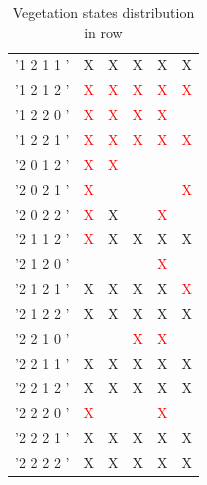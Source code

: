 \documentclass[preprint,3p,times,twocolumn]{elsarticle}
\begin{document}
\begin{table}[h]
\begin{center}
\begin{tabular}{|p{}|p{}|p{}|p{}|p{}|p{}|}
			'1 2 1 1 '     & X                     & X                     & X                  & X                  & X                   \\
			'1 2 1 2 '     & \textcolor{red}{X}    & \textcolor{red}{X}    & \textcolor{red}{X} & \textcolor{red}{X} & \textcolor{red}{X}  \\
			'1 2 2 0 '     & \textcolor{red}{X}    & \textcolor{red}{X}    & \textcolor{red}{X} & \textcolor{red}{X}  &                    \\
			'1 2 2 1 '     & \textcolor{red}{X}    & \textcolor{red}{X}    & \textcolor{red}{X} & \textcolor{red}{X} & \textcolor{red}{X}  \\
			'2 0 1 2 '     & \textcolor{red}{X}    & \textcolor{red}{X}    &                    &                    &                     \\
			'2 0 2 1 '     & \textcolor{red}{X}    &                       &                    &                    & \textcolor{red}{X}  \\
			'2 0 2 2 '     & \textcolor{red}{X}    & X                     &                    & \textcolor{red}{X} &                     \\
			'2 1 1 2 '     & \textcolor{red}{X}    & X                     & X                  & X                  & X                   \\
			'2 1 2 0 '     &                       &                       &                    & \textcolor{red}{X} &                     \\
			'2 1 2 1 '     & X                     & X                     & X                  & X                  & \textcolor{red}{X}  \\
			'2 1 2 2 '     & X                     & X                     & X                  & X                  & X                   \\
			'2 2 1 0 '     &                       &                       & \textcolor{red}{X} & \textcolor{red}{X} &                     \\
			'2 2 1 1 '     & X                     & X                     & X                  & X                  & X                   \\
			'2 2 1 2 '     & X                     & X                     & X                  & X                  & X                   \\
			'2 2 2 0 '     & \textcolor{red}{X}    &                       &                    & \textcolor{red}{X} &                     \\
			'2 2 2 1 '     & X                     & X                     & X                  & X                  & X                   \\ 
			'2 2 2 2 '     & X                     & X                     & X                  & X                  & X                   \\ \hline
			
			
		\end{tabular} 
		\caption{Vegetation states distribution in row}\label{tb:stepVegState}
	\end{center}
\end{table}
\end{document}
